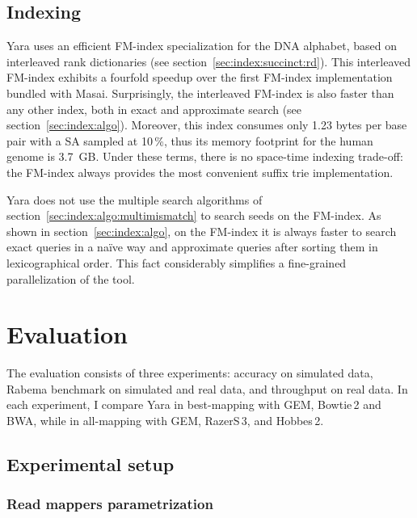 \subsection{Indexing}
\label{sec:yara:eng:indexing}

Yara uses an efficient FM-index specialization for the DNA alphabet, based on interleaved rank dictionaries (see section~\ref{sec:index:succinct:rd}).
This interleaved FM-index exhibits a fourfold speedup over the first FM-index implementation bundled with Masai.
Surprisingly, the interleaved FM-index is also faster than any other index, both in exact and approximate search (see section~\ref{sec:index:algo}).
Moreover, this index consumes only 1.23 bytes per base pair with a SA sampled at 10\,\%, thus its memory footprint for the human genome is 3.7~GB.
Under these terms, there is no space-time indexing trade-off: the FM-index always provides the most convenient suffix trie implementation.

Yara does not use the multiple search algorithms of section~\ref{sec:index:algo:multimismatch} to search seeds on the FM-index.
As shown in section~\ref{sec:index:algo}, on the FM-index it is always faster to search exact queries in a na\"ive way and approximate queries after sorting them in lexicographical order.
This fact considerably simplifies a fine-grained parallelization of the tool.



\section{Evaluation}
\label{sec:yara:eval}

The evaluation consists of three experiments: accuracy on simulated data, Rabema benchmark on simulated and real data, and throughput on real data.
In each experiment, I compare Yara in best-mapping with GEM, Bowtie\,2 and BWA, while in all-mapping with GEM, RazerS\,3, and Hobbes\,2.

\subsection{Experimental setup}

\subsubsection{Read mappers parametrization}

